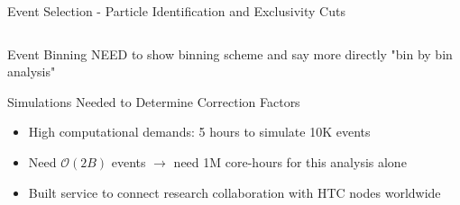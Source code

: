 \documentclass[aspectratio=169]{beamer}
\begin{document}
\begin{frame}{Event Selection - Particle Identification and Exclusivity Cuts}
\begin{columns}[c]
\begin{column}{0.65\textwidth}
\begin{columns}[t, onlytextwidth]
                	


        \end{columns}
        \end{column}   
        \end{columns}
\end{frame}




\begin{frame}{Event Binning}
NEED to show binning scheme and say more directly "bin by bin analysis"
        
\end{frame}




\begin{frame}{Simulations Needed to Determine Correction Factors}
                  \begin{itemize}
                        \item   High computational demands: 5 hours to simulate 10K events
    \item Need $\mathcal{O}(2B)$ events $\rightarrow$ need 1M core-hours for this analysis alone
    \item Built service to connect research collaboration with HTC nodes worldwide

                    \end{itemize}

\end{frame}
\end{document}
